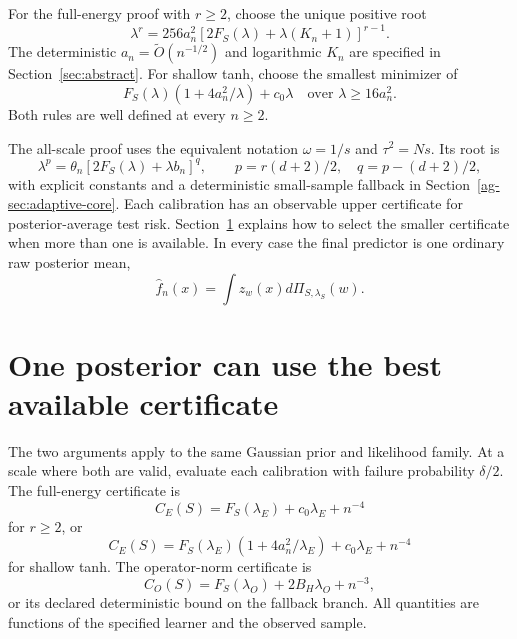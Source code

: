 \documentclass[11pt]{article}
\theoremstyle{definition}\newtheorem{definition}[theorem]{Definition}
\theoremstyle{remark}\newtheorem{remark}[theorem]{Remark}
\begin{document}
For the full-energy proof with $r\ge2$, choose the unique positive root
\begin{equation}
 \lambda^r=256a_n^2[2F_S(\lambda)+\lambda(K_n+1)]^{r-1}.
 \label{eq:root-calibration}
\end{equation}
The deterministic $a_n=\widetilde O(n^{-1/2})$ and logarithmic $K_n$ are specified in Section~\ref{sec:abstract}. For shallow tanh, choose the smallest minimizer of
\begin{equation}
 F_S(\lambda)(1+4a_n^2/\lambda)+c_0\lambda
 \quad\text{over }\lambda\ge16a_n^2.
 \label{eq:shallow-calibration}
\end{equation}
Both rules are well defined at every $n\ge2$.

The all-scale proof uses the equivalent notation $\omega=1/s$ and $\tau^2=Ns$. Its root is
\[
 \lambda^p=\theta_n[2F_S(\lambda)+\lambda b_n]^q,
 \qquad p=r(d+2)/2,\quad q=p-(d+2)/2,
\]
with explicit constants and a deterministic small-sample fallback in Section~\ref{ag-sec:adaptive-core}. Each calibration has an observable upper certificate for posterior-average test risk. Section~\ref{sec:certificate-selection} explains how to select the smaller certificate when more than one is available. In every case the final predictor is one ordinary raw posterior mean,
\[
 \widehat f_n(x)=\int z_w(x)d\Pi_{S,\lambda_S}(w).
\]













\section{One posterior can use the best available certificate}
\label{sec:certificate-selection}
The two arguments apply to the same Gaussian prior and likelihood family. At a scale where both are valid, evaluate each calibration with failure probability $\delta/2$. The full-energy certificate is
\[
 C_E(S)=F_S(\lambda_E)+c_0\lambda_E+n^{-4}
\]
for $r\ge2$, or
\[
 C_E(S)=F_S(\lambda_E)(1+4a_n^2/\lambda_E)+c_0\lambda_E+n^{-4}
\]
for shallow tanh. The operator-norm certificate is
\[
 C_O(S)=F_S(\lambda_O)+2B_H\lambda_O+n^{-3},
\]
or its declared deterministic bound on the fallback branch. All quantities are functions of the specified learner and the observed sample.
\end{document}

